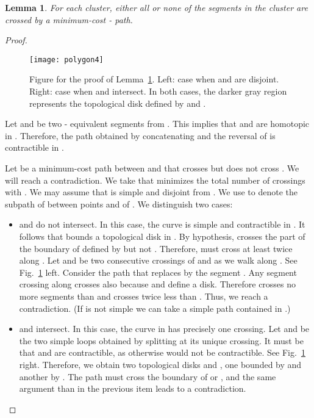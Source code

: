 \documentclass[11pt,a4paper]{article}
\newtheorem{lemma}[definition]{Lemma}
\begin{document}
\begin{lemma}\label{le:clusters2}
For each cluster, either all or none of the 
segments in the cluster are crossed by a minimum-cost - path. 
\end{lemma}
\begin{proof}

\begin{figure}[t]
\centering
\texttt{[image: polygon4]}
\caption{Figure for the proof of Lemma~\ref{le:clusters2}. Left: case when  and  are disjoint.
	Right: case when  and  intersect. In both cases, the darker gray region represents the topological disk defined by  and .}
\label{fig:polygon4}
\end{figure}

Let  and  be two - equivalent segments from .
This implies that  and  are homotopic in .
Therefore, the path  obtained by concatenating  and the reversal of  is contractible in .

Let  be a minimum-cost path between  and  that crosses  but does not cross .
We will reach a contradiction.
We take  that minimizes the total number of crossings with . 
We may assume that  is simple and disjoint from .
We use  to denote the subpath of  between points  and  of . 
We distinguish two cases:
\begin{itemize}
	\item  and  do not intersect. In this case, the curve  is simple and contractible
		in . It follows that  bounds a topological disk  in .
		By hypothesis,  crosses the part of the boundary of  defined by  but
		not . Therefore,  must cross at least twice along . Let  and  be two consecutive crossings of  and 
		as we walk along . See Fig.~\ref{fig:polygon4} left. Consider the path  that replaces  by the segment .
		Any segment  crossing  along  crosses also  because  and  define a disk.
		Therefore  crosses no more segments than  and crosses  twice less than .
		Thus, we reach a contradiction. (If  is not simple we can take a simple path contained in .)
	\item  and  intersect. In this case, the curve  
		in  has precisely one crossing. Let  and  be the two simple loops
		obtained by splitting  at its unique crossing. It must be that  and  are contractible,
		as otherwise  would not be contractible. See Fig.~\ref{fig:polygon4} right.
		Therefore, we obtain two topological disks  and , one bounded by  and another by .
		The path  must cross the boundary of  or , and the same argument than in the previous item
		leads to a contradiction.\qedhere
\end{itemize}
\end{proof}
\end{document}
